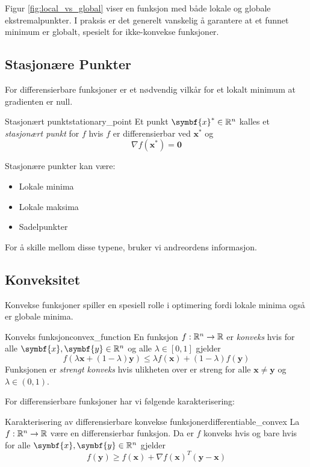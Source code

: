 Figur \ref{fig:local_vs_global} viser en funksjon med både lokale og globale ekstremalpunkter. I praksis er det generelt vanskelig å garantere at et funnet minimum er globalt, spesielt for ikke-konvekse funksjoner.

\subsection{Stasjonære Punkter}

For differensierbare funksjoner er et nødvendig vilkår for et lokalt minimum at gradienten er null.

\begin{definition}{Stasjonært punkt}{stationary_point}
	Et punkt \(\symbf{x}^\ast \in \R^n\) kalles et \textit{stasjonært punkt} for \(f\) hvis \(f\) er differensierbar ved \(\symbf{x}^\ast\) og
	\[
		\nabla f(\symbf{x}^\ast) = \symbf{0}
	\]
\end{definition}

Stasjonære punkter kan være:
\begin{itemize}
	\item Lokale minima
	\item Lokale maksima
	\item Sadelpunkter
\end{itemize}

For å skille mellom disse typene, bruker vi andreordens informasjon.

\subsection{Konveksitet}

Konvekse funksjoner spiller en spesiell rolle i optimering fordi lokale minima også er globale minima.

\begin{definition}{Konveks funksjon}{convex_function}
	En funksjon \(f: \mathbb{R}^n \to \mathbb{R}\) er \textit{konveks} hvis for alle \(\symbf{x}, \symbf{y} \in \R^n\) og alle \(\lambda \in [0,1]\) gjelder
	\[
		f(\lambda \symbf{x} + (1-\lambda)\symbf{y}) \leq \lambda f(\symbf{x}) + (1-\lambda)f(\symbf{y})
	\]
	Funksjonen er \textit{strengt konveks} hvis ulikheten over er streng for alle \(\symbf{x} \neq \symbf{y}\) og \(\lambda \in (0,1)\).
\end{definition}

For differensierbare funksjoner har vi følgende karakterisering:

\begin{proposition}{Karakterisering av differensierbare konvekse funksjoner}{differentiable_convex}
	La \(f: \mathbb{R}^n \to \mathbb{R}\) være en differensierbar funksjon. Da er \(f\) konveks hvis og bare hvis for alle \(\symbf{x}, \symbf{y} \in \R^n\) gjelder
	\[
		f(\symbf{y}) \geq f(\symbf{x}) + \nabla f(\symbf{x})^T (\symbf{y} - \symbf{x})
	\]
\end{proposition}

